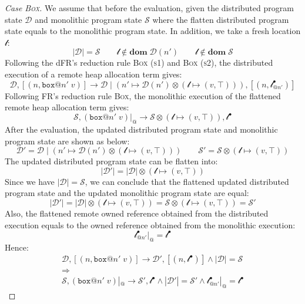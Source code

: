 \begin{proof}[Case \textsc{\emph{Box}}]
We assume that before the evaluation, given the distributed program state $\mathcal{D}$ and monolithic program state $\mathcal{S}$ where the flatten distributed program state equals to the monolithic program state. In addition, we take a fresh location $\mathscr{l}$:
\[
|\mathcal{D}| = \mathcal{S} \quad\quad \mathscr{l} \notin \textbf{dom}\; \mathcal{D}(n') \quad\quad \mathscr{l} \notin \textbf{dom}\; \mathcal{S}
\]
Following the dFR's reduction rule \textsc{Box (s1)} and \textsc{Box (s2)}, the distributed execution of a remote heap allocation term gives:
\[
\mathcal{D}, [(n, \texttt{box}@n'\;v)] \longrightarrow \mathcal{D} \mid (n' \mapsto \mathcal{D}(n')\otimes(\mathscr{l} \mapsto (v, \top))), [(n, \mathscr{l}^\bullet_{@n'})]
\]
Following FR's reduction rule \textsc{Box}, the monolithic execution of the flattened remote heap allocation term gives:
\[
\mathcal{S}, (\texttt{box}@n'\;v)|_@ \longrightarrow \mathcal{S} \otimes (\mathscr{l} \mapsto (v, \top)), \mathscr{l}^\bullet
\]
After the evaluation, the updated distributed program state and monolithic program state are shown as below:
\[
\mathcal{D}' = \mathcal{D} \mid (n' \mapsto \mathcal{D}(n')\otimes(\mathscr{l} \mapsto (v, \top))) \quad\quad 
\mathcal{S}' = \mathcal{S} \otimes (\mathscr{l} \mapsto (v, \top))
\]
The updated distributed program state can be flatten into:
\[|\mathcal{D}'| = |\mathcal{D}| \otimes (\mathscr{l} \mapsto (v, \top))\]
Since we have $|\mathcal{D}| = \mathcal{S}$, we can conclude that the flattened updated distributed program state and the updated monolithic program state are equal:
\[|\mathcal{D}'| = |\mathcal{D}| \otimes (\mathscr{l} \mapsto (v, \top)) = \mathcal{S} \otimes (\mathscr{l} \mapsto (v, \top))= \mathcal{S}'\]
Also, the flattened remote owned reference obtained from the distributed execution equals to the owned reference obtained from the monolithic execution:
\[\mathscr{l}^\bullet_{@n'}|_@ = \mathscr{l}^\bullet\]
Hence:
\begin{gather*}
\mathcal{D}, [(n, \texttt{box}@n'\;v)] \longrightarrow \mathcal{D'}, [(n, \mathscr{l}^\bullet)] \land |\mathcal{D}| = \mathcal{S} \\\Rightarrow\\ \mathcal{S},  (\texttt{box}@n'\;v)|_@ \longrightarrow \mathcal{S'}, \mathscr{l}^\bullet \land |\mathcal{D}'| = \mathcal{S}' \land \mathscr{l}^\bullet_{@n'}|_@ = \mathscr{l}^\bullet
\end{gather*}

\end{proof}
